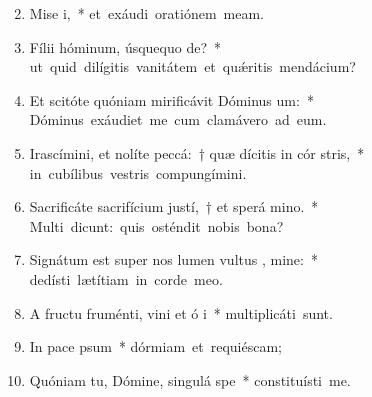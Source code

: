 \begin{flushleft}
\begin{enumerate}[leftmargin=*]
\setcounter{enumi}{1}

\item Mise i,~* \mbox{et exáudi oratiónem meam.}

\item Fílii hóminum, úsquequo  de?~* \mbox{ut quid dilígitis vanitátem et qu\'{\ae}ritis mendácium?}

\item Et scitóte quóniam mirificávit Dóminus  um:~* \mbox{Dóminus exáudiet me cum clamávero ad eum.}

\item Irascímini, et nolíte peccá:~† quæ dícitis in cór stris,~* \mbox{in cubílibus vestris compungímini.}

\item Sacrificáte sacrifícium justí,~† et sperá  mino.~* \mbox{Multi dicunt: quis osténdit nobis bona?}

\item Signátum est super nos lumen vultus , mine:~* \mbox{dedísti lætítiam in corde meo.}

\item A fructu fruménti, vini et ó i~* \mbox{multiplicáti sunt.}

\item In pace  psum~* \mbox{dórmiam et requiéscam;}

\item Quóniam tu, Dómine, singulá  spe~* \mbox{constituísti me.}


\end{enumerate}
\end{flushleft}


